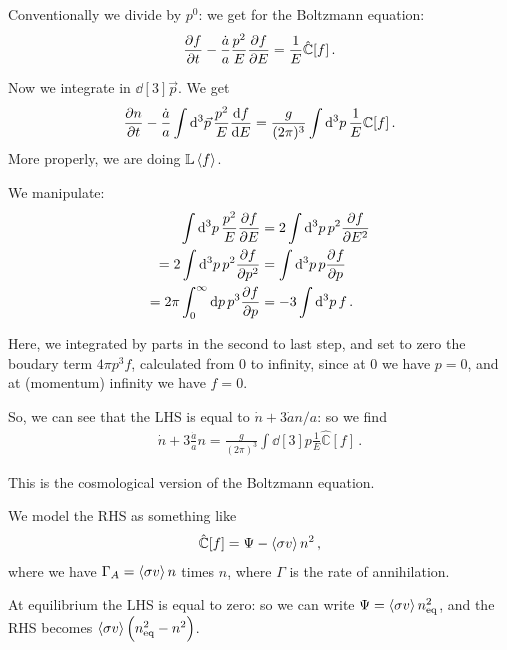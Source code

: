 \documentclass[main.tex]{subfiles}
\begin{document}
Conventionally we divide by \(p^{0}\): we get for the Boltzmann equation: 
%
\begin{align}
  \pdv{f}{t} - \frac{\dot{a}}{a } \frac{p^2}{E} \pdv{f}{E} = \frac{1}{E} \hat{\mathbb{C}} [f]
\,.
\end{align}

Now we integrate in \(\dd[3]{\vec{p}}\). We get 
%
\begin{align}
  \pdv{n}{t} - \frac{\dot{a}}{a } \int  \dd[3]{\vec{p}} \frac{p^2}{E} \dv{f}{E} = \frac{g }{(2\pi )^3} \int  \dd[3]{p} \frac{1}{E} \mathbb{C} [f]  
\,.
\end{align}
%
More properly, we are doing \(\mathbb{L} \expval{f}\). 

We manipulate: 
%
\begin{subequations}
\begin{align}
  \int \dd[3]{p} \frac{p^2}{E} \pdv{f}{E} 
  &= 2 \int \dd[3]{p} p^2 \pdv{f}{E^2} \\
  = 2 \int \dd[3]{p} p^2 \pdv{f}{p^2} 
  &= \int \dd[3]{p} p \pdv[]{f}{p} \\
  = 2 \pi \int_{0}^{ \infty } \dd{p} p^3 \pdv{f}{p} 
  &= -3 \int \dd[3]{p} f
\,.
\end{align}
\end{subequations}
%

Here, we integrated by parts in the second to last step, and set to zero the boudary term \(4 \pi p^3 f\), calculated from 0 to infinity, since at \(0\) we have \(p=0\), and at (momentum) infinity we have \(f=0\).

So, we can see that the LHS is equal to \(\dot{n} + 3 \dot{a}n/a \): so we find 
%
\begin{align}
  \dot{n} + 3 \frac{\dot{a}}{a} n = \frac{g}{(2 \pi )^3} \int \dd[3]{p} \frac{1}{E} \hat{\mathbb{C}} [f]
\,.
\end{align}

This is the cosmological version of the Boltzmann equation. 

We model the RHS as something like 
%
\begin{align}
  \hat{\mathbb{C}}[f] = \Psi - \expval{\sigma v } n^2
\,,
\end{align}
%
where we have \(\Gamma_A = \expval{\sigma v} n\) times \(n\), where \(\Gamma \) is the rate of annihilation. 

At equilibrium the LHS is 
equal to zero: so we can write \(\Psi = \expval{\sigma v} n^2 _{\text{eq}}\), and the RHS becomes \(\expval{\sigma v} \qty(n^2 _{\text{eq}} - n^2)\).
\end{document}
